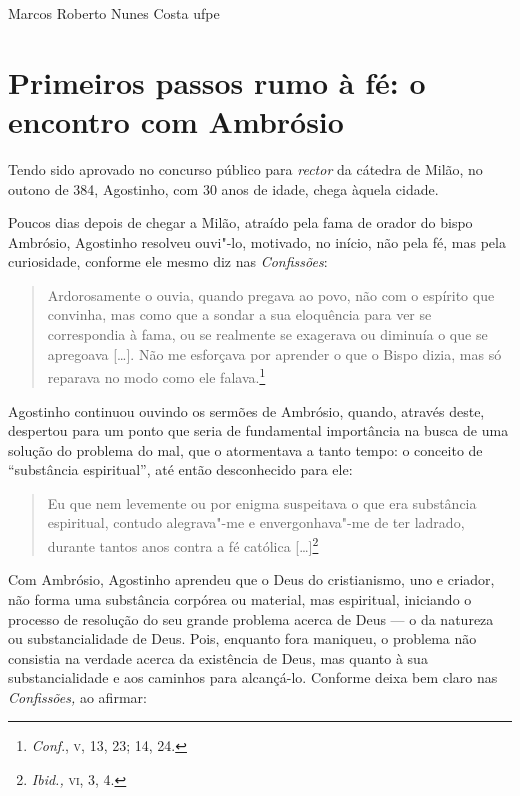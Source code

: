 %
	{Marcos Roberto Nunes Costa}%
	{ufpe}


\section{Primeiros passos rumo à fé: o encontro com  Ambrósio}

Tendo sido aprovado no concurso público para \emph{rector} da
cátedra de Milão,  no outono de 384, Agostinho, com 30 anos de
idade,  chega àquela cidade. 

Poucos dias depois de chegar a Milão, atraído pela fama de orador
do bispo Ambrósio, Agostinho resolveu ouvi"-lo,
motivado, no início, não pela fé, mas pela curiosidade, conforme
ele mesmo diz nas \emph{Confissões}: 

\begin{quote}
Ardorosamente o ouvia, quando pregava ao povo, não com o espírito
que convinha, mas como que a sondar a sua eloquência para ver se
correspondia à fama, ou se realmente se exagerava ou diminuía o
que se apregoava [\ldots{}]. Não me esforçava por aprender o que o
Bispo dizia, mas só reparava no modo como ele falava.\footnote{
\emph{Conf}., \textsc{v}, 13, 23; 14, 24.}
\end{quote}

Agostinho continuou ouvindo os sermões de Ambrósio, quando,
através deste, despertou para um ponto que seria de fundamental
importância na busca de uma solução do problema do mal,  que o
atormentava a tanto tempo: o conceito de “substância
espiritual”, até então desconhecido para ele: 

\begin{quote}
Eu que nem levemente ou por enigma  suspeitava o que era
substância espiritual, contudo alegrava"-me e envergonhava"-me de
ter ladrado, durante tantos anos contra a fé católica
[\ldots{}]\footnote{ \emph{Ibid.,} \textsc{vi}, 3, 4.}
\end{quote}

Com Ambrósio, Agostinho aprendeu que o Deus do cristianismo, uno
e criador, não forma uma substância corpórea ou material, mas
espiritual, iniciando o processo de resolução do seu grande
problema acerca de Deus --- o da natureza ou substancialidade de
Deus. Pois, enquanto fora maniqueu, o problema não consistia na
verdade acerca da existência de Deus, mas quanto à sua
substancialidade e aos caminhos para alcançá-lo. Conforme deixa
bem claro nas\emph{ Confissões,} ao afirmar: 

